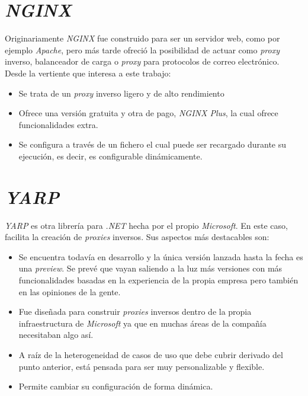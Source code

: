 \documentclass[11pt,spanish,listoffigures]{tfgetsinf}
\begin{document}
\section{\emph{NGINX}}
Originariamente \emph{NGINX} \cite{NGINX} fue construido para ser un servidor web, como por ejemplo \emph{Apache}, pero más tarde ofreció la posibilidad de actuar como \emph{proxy} inverso, balanceador de carga o \emph{proxy} para protocolos de correo electrónico. Desde la vertiente que interesa a este trabajo:

\begin{itemize}

	\item Se trata de un \emph{proxy} inverso ligero y de alto rendimiento
	\item Ofrece una versión gratuita y otra de pago, \emph{NGINX Plus}, la cual ofrece funcionalidades extra.
	\item Se configura a través de un fichero el cual puede ser recargado durante su ejecución, es decir, es configurable dinámicamente.

\end{itemize}

\section{\emph{YARP}}
\emph{YARP} \cite{YARP} es otra librería para \emph{.NET} hecha por el propio \emph{Microsoft}. En este caso, facilita la creación de \emph{proxies} inversos. Sus aspectos más destacables son:

\begin{itemize}

	\item Se encuentra todavía en desarrollo y la única versión lanzada hasta la fecha es una \emph{preview}. Se prevé que vayan saliendo a la luz más versiones con más funcionalidades basadas en la experiencia de la propia empresa pero también en las opiniones de la gente.
	\item Fue diseñada para construir \emph{proxies} inversos dentro de la propia infraestructura de \emph{Microsoft} ya que en muchas áreas de la compañía necesitaban algo así.
	\item A raíz de la heterogeneidad de casos de uso que debe cubrir derivado del punto anterior, está pensada para ser muy personalizable y flexible.
	\item Permite cambiar su configuración de forma dinámica.

\end{itemize}
\end{document}
